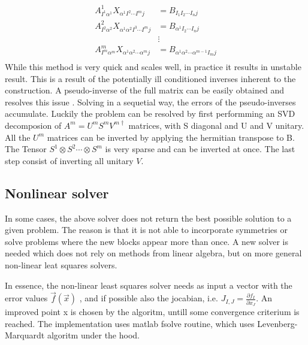 \begin{equation}
    \begin{split}
        A^1_{ I^1 \alpha^1 } X_{ \alpha^1  I^2 \cdots I^m j} &=  B_{  I_1  I_2 \cdots I_n   j }\\
        A^2_{ I^2 \alpha^2 } X_{ \alpha^1   \alpha^2  I^3 \cdots I^m j} &=  B_{  \alpha^1  I_2 \cdots I_n   j }\\
        &\vdots\\
        A^m_{ I^m \alpha^m } X_{ \alpha^1 \alpha^2 \cdots \alpha^m j  } &=  B_{ \alpha^1 \alpha^2 \cdots \alpha^{m-1} I_m   j }\\
    \end{split}
\end{equation}
While this method is very quick and scales well, in practice it results in unstable result. This is a result of the potentially ill conditioned inverses inherent to the construction. A pseudo-inverse of the full matrix can be easily obtained and resolves this issue . Solving in a sequetial way, the errors of the pseudo-inverses accumulate. Luckily the problem can be resolved by first performming an SVD decomposion of $A^m = U^m S^m  V^{m\dagger}$ matrices, with S diagonal and U and V unitary. All the $U^m$ matrices can be inverted by applying the hermitian transpose to B. The Tensor $S^1 \otimes S^2 \cdots \otimes S^m$ is very sparse and can be inverted at once. The last step consist of inverting all unitary $V$.

\subsection{Nonlinear solver}

In some cases, the above solver does not return the best possible solution to a given problem. The reason is that it is not able to incorporate symmetries or solve problems where the new blocks appear more than once. A new solver is needed which does not rely on methods from linear algebra, but on more general non-linear leat squares solvers.

In essence, the non-linear least squares solver needs as input a vector with the error values $\vec{f}( \vec{x} )$ , and if possible also the jocabian, i.e. $ J_{I,J}  = \frac{ \partial f_I }{ \partial x_J } $. An improved point x is chosen by the algoritm, untill some convergence criterium is reached. The implementation uses matlab fsolve routine, which uses Levenberg-Marquardt algoritm under the hood.

